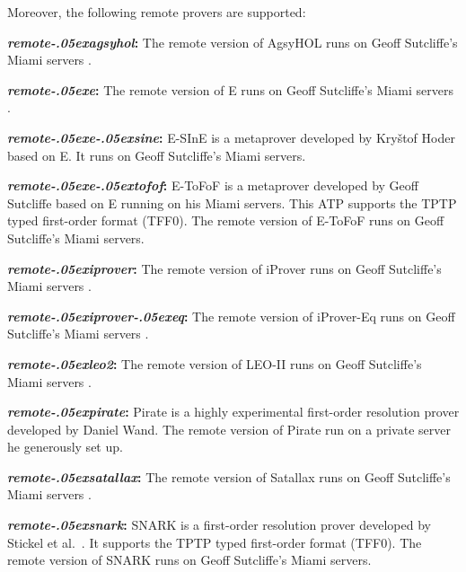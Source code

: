 \documentclass[a4paper,12pt]{article}
\renewcommand\_{\hbox{\textunderscore\kern-.05ex}}
\begin{document}
\begin{enum}
\begin{sloppy}
\end{sloppy}

Moreover, the following remote provers are supported:

\begin{enum}
\item[\labelitemi] \textbf{\textit{remote\_agsyhol}:} The remote version of
AgsyHOL runs on Geoff Sutcliffe's Miami servers \cite{sutcliffe-2000}.

\item[\labelitemi] \textbf{\textit{remote\_e}:} The remote version of E runs
on Geoff Sutcliffe's Miami servers \cite{sutcliffe-2000}.

\item[\labelitemi] \textbf{\textit{remote\_e\_sine}:} E-SInE is a metaprover
developed by Kry\v stof Hoder \cite{sine} based on E. It runs on Geoff
Sutcliffe's Miami servers.

\item[\labelitemi] \textbf{\textit{remote\_e\_tofof}:} E-ToFoF is a metaprover
developed by Geoff Sutcliffe \cite{tofof} based on E running on his Miami
servers. This ATP supports the TPTP typed first-order format (TFF0). The
remote version of E-ToFoF runs on Geoff Sutcliffe's Miami servers.

\item[\labelitemi] \textbf{\textit{remote\_iprover}:} The
remote version of iProver runs on Geoff Sutcliffe's Miami servers
\cite{sutcliffe-2000}.

\item[\labelitemi] \textbf{\textit{remote\_iprover\_eq}:} The
remote version of iProver-Eq runs on Geoff Sutcliffe's Miami servers
\cite{sutcliffe-2000}.

\item[\labelitemi] \textbf{\textit{remote\_leo2}:} The remote version of LEO-II
runs on Geoff Sutcliffe's Miami servers \cite{sutcliffe-2000}.

\item[\labelitemi] \textbf{\textit{remote\_pirate}:} Pirate is a
highly experimental first-order resolution prover developed by Daniel Wand.
The remote version of Pirate run on a private server he generously set up.

\item[\labelitemi] \textbf{\textit{remote\_satallax}:} The remote version of
Satallax runs on Geoff Sutcliffe's Miami servers \cite{sutcliffe-2000}.

\item[\labelitemi] \textbf{\textit{remote\_snark}:} SNARK is a first-order
resolution prover developed by Stickel et al.\ \cite{snark}. It supports the
TPTP typed first-order format (TFF0). The remote version of SNARK runs on
Geoff Sutcliffe's Miami servers.


\end{enum}
\end{enum}
\end{document}
